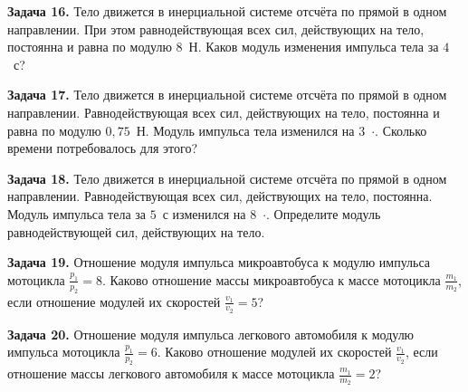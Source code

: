 \begin{taskbasic}[code={\label{task:dem26_v16_n3}}]
\textbf{Задача 16.} Тело движется в инерциальной системе отсчёта по прямой в одном направлении. При этом равнодействующая всех сил, действующих на тело, постоянна и равна по модулю $8$~Н. Каков модуль изменения импульса тела за $4$~с?

\end{taskbasic}

\begin{taskbasic}[code={\label{task:dem26_v17_n3}}]
\textbf{Задача 17.} Тело движется в инерциальной системе отсчёта по прямой в одном направлении. Равнодействующая всех сил, действующих на тело, постоянна и равна по модулю $0{,}75$~Н. Модуль импульса тела изменился на $3$~$\cdot$. Сколько времени потребовалось для этого?

\end{taskbasic}

\begin{taskbasic}[code={\label{task:dem26_v18_n3}}]
\textbf{Задача 18.} Тело движется в инерциальной системе отсчёта по прямой в одном направлении. Равнодействующая всех сил, действующих на тело, постоянна. Модуль импульса тела за $5$~с изменился на $8$~$\cdot$. Определите модуль равнодействующей сил, действующих на тело.

\end{taskbasic}

\begin{taskbasic}[code={\label{task:dem26_v19_n3}}]
\textbf{Задача 19.} Отношение модуля импульса микроавтобуса к модулю импульса мотоцикла $\frac{p_1}{p_2}=8$. Каково отношение массы микроавтобуса к массе мотоцикла $\frac{m_1}{m_2}$, если отношение модулей их скоростей $\frac{v_1}{v_2}=5$?

\end{taskbasic}

\begin{taskbasic}[code={\label{task:dem26_v20_n3}}]
\textbf{Задача 20.} Отношение модуля импульса легкового автомобиля к модулю импульса мотоцикла $\frac{p_1}{p_2}=6$. Каково отношение модулей их скоростей $\frac{v_1}{v_2}$, если отношение массы легкового автомобиля к массе мотоцикла $\frac{m_1}{m_2}=2$?

\end{taskbasic}
